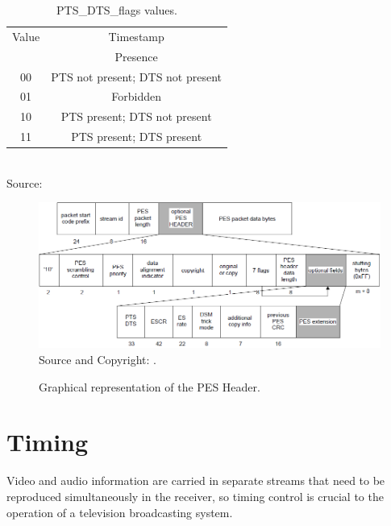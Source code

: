 \documentclass[
	12pt,				%
	openright,			%
	twoside,			%
	a4paper,			%
	brazil,
	french,				%
	english
	]{abntex2}
\begin{document}
\begin{table}[!hb]
\caption{PTS\hspace{0.1mm}\_\hspace{0.1mm}DTS\hspace{0.1mm}\_\hspace{0.1mm}flags values.}
\begin{center}
\begin{tabular}{|c|c|}
\hline
Value & Timestamp \\
& Presence \\
\hline
00 & PTS not present; DTS not present\\
\hline
01 & Forbidden\\
\hline
10 & PTS present; DTS not present\\
\hline
11 & PTS present; DTS present\\
\hline
\end{tabular}
\label{tab_PTS_DTS_flags}
\\Source: 
\end{center}
\end{table}

\begin{figure}
\centering
\caption{Graphical representation of the PES Header.}
\includegraphics[width=1\linewidth]{figuras/PES_iso13818.png}
\\Source and Copyright: .
\label{fig:PES_iso13818}
\end{figure}

\section{Timing}
\label{Timing}

Video and audio information are carried in separate streams that need to be reproduced simultaneously in the receiver, so timing control is crucial to the operation of a television broadcasting system.
\end{document}
